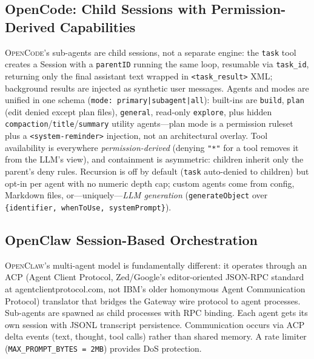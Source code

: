\documentclass[11pt,a4paper]{article}
\newcommand{\ocl}{\textsc{OpenClaw}\xspace}
\newcommand{\ocd}{\textsc{OpenCode}\xspace}
\begin{document}
\subsection{OpenCode: Child Sessions with Permission-Derived Capabilities}

\ocd{}'s sub-agents are child sessions, not a separate engine: the \texttt{task} tool creates a Session with a \texttt{parentID} running the same loop, resumable via \texttt{task\_id}, returning only the final assistant text wrapped in \texttt{<task\_result>} XML; background results are injected as synthetic user messages.
Agents and modes are unified in one schema (\texttt{mode: primary|subagent|all}): built-ins are \texttt{build}, \texttt{plan} (edit denied except plan files), \texttt{general}, read-only \texttt{explore}, plus hidden \texttt{compaction}/\texttt{title}/\texttt{summary} utility agents---plan mode is a permission ruleset plus a \texttt{<system-reminder>} injection, not an architectural overlay.
Tool availability is everywhere \emph{permission-derived} (denying \texttt{"*"} for a tool removes it from the LLM's view), and containment is asymmetric: children inherit only the parent's deny rules.
Recursion is off by default (\texttt{task} auto-denied to children) but opt-in per agent with no numeric depth cap; custom agents come from config, Markdown files, or---uniquely---\emph{LLM generation} (\texttt{generateObject} over \texttt{\{identifier, whenToUse, systemPrompt\}}).

\subsection{OpenClaw Session-Based Orchestration}

\ocl{}'s multi-agent model is fundamentally different: it operates through an ACP (Agent Client Protocol, Zed/Google's editor-oriented JSON-RPC standard at agentclientprotocol.com, not IBM's older homonymous Agent Communication Protocol) translator that bridges the Gateway wire protocol to agent processes.
Sub-agents are spawned as child processes with RPC binding.
Each agent gets its own session with JSONL transcript persistence.
Communication occurs via ACP delta events (text, thought, tool calls) rather than shared memory.
A rate limiter (\texttt{MAX\_PROMPT\_BYTES = 2MB}) provides DoS protection.
\end{document}
